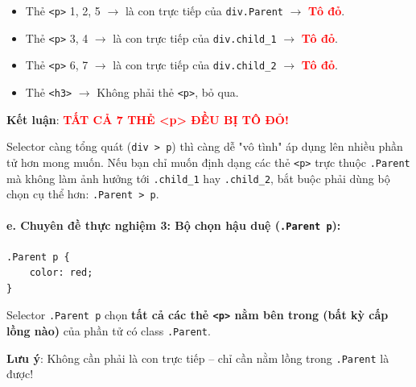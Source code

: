 \documentclass[11pt,oneside]{book}
\newcommand{\codeinline}[1]{\textcolor{accentOrange}{\texttt{#1}}}
\begin{document}
\begin{noteBox}
\begin{itemize}[leftmargin=1.5em, itemsep=3pt, parsep=0pt]
    \item Thẻ \codeinline{<p>} 1, 2, 5 $\rightarrow$ là con trực tiếp của \codeinline{div.Parent} $\rightarrow$ \textcolor{red}{\textbf{Tô đỏ}}.
    \item Thẻ \codeinline{<p>} 3, 4 $\rightarrow$ là con trực tiếp của \codeinline{div.child\_1} $\rightarrow$ \textcolor{red}{\textbf{Tô đỏ}}.
    \item Thẻ \codeinline{<p>} 6, 7 $\rightarrow$ là con trực tiếp của \codeinline{div.child\_2} $\rightarrow$ \textcolor{red}{\textbf{Tô đỏ}}.
    \item Thẻ \codeinline{<h3>} $\rightarrow$ Không phải thẻ \codeinline{<p>}, bỏ qua.
\end{itemize}
\textbf{Kết luận}: \textcolor{red}{\textbf{TẤT CẢ 7 THẺ <p> ĐỀU BỊ TÔ ĐỎ!}}
\end{noteBox}

\begin{warnBox}
Selector càng tổng quát (\codeinline{div > p}) thì càng dễ "vô tình" áp dụng lên nhiều phần tử hơn mong muốn. Nếu bạn chỉ muốn định dạng các thẻ \codeinline{<p>} trực thuộc \codeinline{.Parent} mà không làm ảnh hưởng tới \codeinline{.child\_1} hay \codeinline{.child\_2}, bắt buộc phải dùng bộ chọn cụ thể hơn: \codeinline{.Parent > p}.
\end{warnBox}

\paragraph{e. Chuyên đề thực nghiệm 3: Bộ chọn hậu duệ (\codeinline{.Parent p}):}

\begin{codeWindow}
\begin{lstlisting}[language=CSS3]
.Parent p {
    color: red;
}
\end{lstlisting}
\end{codeWindow}

\begin{conceptBox}
Selector \codeinline{.Parent p} chọn \textbf{tất cả các thẻ \codeinline{<p>} nằm bên trong (bất kỳ cấp lồng nào)} của phần tử có class \codeinline{.Parent}.
\par\vspace{2pt}
\textbf{Lưu ý}: Không cần phải là con trực tiếp -- chỉ cần nằm lồng trong \codeinline{.Parent} là được!
\end{conceptBox}
\end{document}
